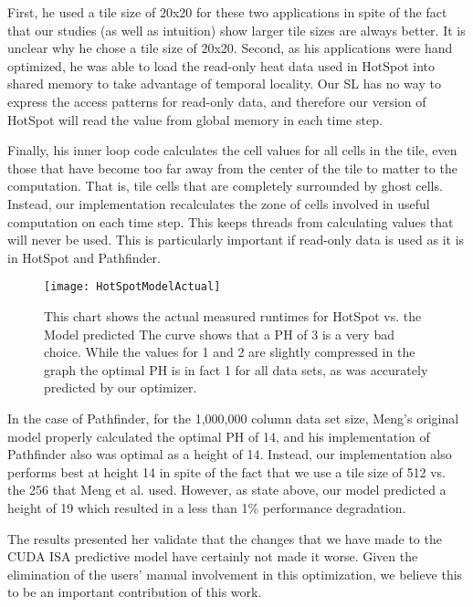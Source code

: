 \documentclass{styles/sig-alternate}
\begin{document}
First, he used a tile size of 20x20 for these two applications in spite of the fact that our studies (as well as intuition) 
show larger tile sizes are always better.  It is unclear why he chose a tile size of 20x20.  
Second, as his applications were hand optimized,
he was able to load the read-only heat data used in HotSpot into shared memory to take advantage of temporal locality.  Our SL has no way to express
the access patterns for read-only data, and therefore our version of HotSpot will read the value from global memory in each time step.

Finally, his inner loop code calculates the cell values for all cells in the tile, even those that have become too far away from the center of the
tile to matter to the computation.  That is, tile cells that are completely surrounded by ghost cells.  Instead, our implementation recalculates the zone
of cells involved in useful computation on each time step.  This keeps threads from calculating values that will never be used.  This is particularly important
if read-only data is used as it is in HotSpot and Pathfinder.

\begin{figure}
\texttt{[image: HotSpotModelActual]}
\caption{This chart shows the actual measured runtimes for HotSpot vs. the Model predicted 
The curve shows that a PH of 3 is a very bad choice.  While the values for 1 and 2 are slightly 
compressed in the graph the optimal PH is in fact 1 for all data sets, as was accurately predicted by our optimizer.}
\label{fig:modelvsactual}
\end{figure}

In the case of Pathfinder, for the 1,000,000 column data set size, Meng's original 
model properly calculated the optimal PH of 14, and his implementation
of Pathfinder also was optimal as a height of 14.  Instead, our implementation also performs best at height 14 in spite of 
the fact that we use a tile size of 512 vs. the 256 that Meng et al. used.  However, as state above, our model predicted a height of 19 which resulted
in a less than 1\% performance degradation.

The results presented her validate that the changes that we have made to the CUDA ISA predictive model have certainly not made it worse.
Given the elimination of the users' manual involvement in this optimization, we believe this to be an important contribution of this work.
\end{document}
